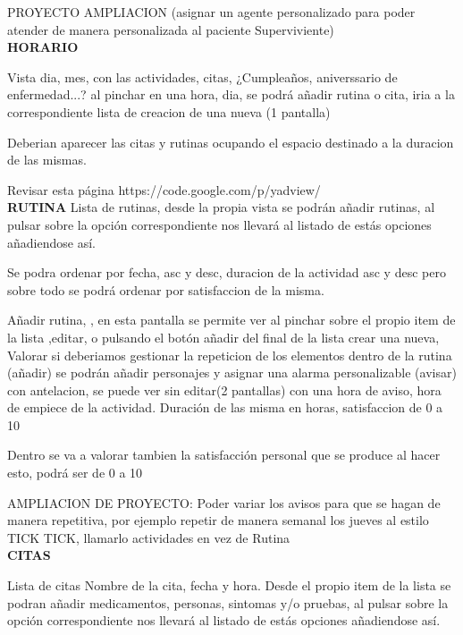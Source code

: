\documentclass[../pfc.tex]{subfiles}
\begin{document}
	PROYECTO AMPLIACION (asignar un agente personalizado para poder atender de manera personalizada al paciente Superviviente)\\
	





	

	\textbf{HORARIO}


	Vista dia, mes, con las actividades, citas, ¿Cumpleaños, aniverssario de enfermedad...?  
	al pinchar en una hora, dia, se podrá añadir rutina o cita, iria a la correspondiente lista de creacion de una nueva (1 pantalla)
	
	Deberian aparecer las citas y rutinas ocupando el espacio destinado a la duracion de las mismas.
	
	Revisar esta página
	https://code.google.com/p/yadview/\\
	

	\textbf{RUTINA}
	Lista de rutinas, desde la propia vista se podrán añadir rutinas, al pulsar sobre la opción correspondiente nos llevará al listado de estás opciones añadiendose así.
	
	Se podra ordenar por fecha, asc y desc, duracion de la actividad asc y desc pero sobre todo se podrá ordenar por satisfaccion de la misma.
	
	Añadir rutina, , en esta pantalla se permite ver al pinchar sobre el propio item de la lista ,editar, o pulsando el botón añadir del final de la lista crear una nueva,
	Valorar si deberiamos gestionar la repeticion de los elementos					
	dentro de la rutina (añadir) se podrán añadir personajes y asignar una alarma personalizable (avisar) con antelacion, se puede ver sin editar(2 pantallas)
	con una hora de aviso, hora de empiece de la actividad. Duración de las misma en horas, satisfaccion de 0 a 10
	
	Dentro se va a valorar tambien la satisfacción personal que se produce al hacer esto, podrá ser de 0 a 10
	
	AMPLIACION DE PROYECTO: Poder variar los avisos para que se hagan de manera repetitiva, por ejemplo repetir de manera semanal los jueves al estilo TICK TICK, llamarlo actividades en vez de Rutina\\ 
	

	\textbf{CITAS}
	
	Lista de citas Nombre de la cita, fecha y hora.
	Desde el propio item de la lista se podran añadir medicamentos, personas, sintomas y/o pruebas, al pulsar sobre la opción correspondiente nos llevará al listado de estás opciones añadiendose así.
	
\end{document}
